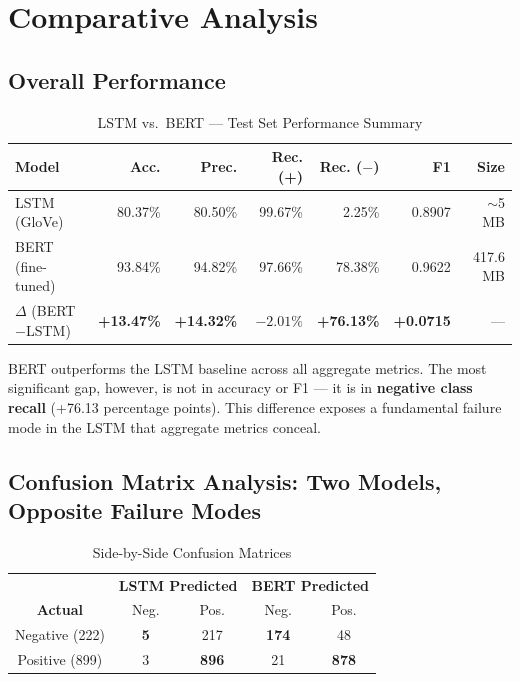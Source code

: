 \documentclass[11pt, a4paper]{article}
\begin{document}
\section{Comparative Analysis}

\subsection{Overall Performance}

\begin{table}[h]
\centering
\caption{LSTM vs.\ BERT --- Test Set Performance Summary}
\begin{tabular}{lrrrrrr}
\toprule
\textbf{Model} & \textbf{Acc.} & \textbf{Prec.} & \textbf{Rec. (+)} & \textbf{Rec. ($-$)} & \textbf{F1} & \textbf{Size} \\
\midrule
LSTM (GloVe)       & 80.37\% & 80.50\% & 99.67\% &  2.25\% & 0.8907 & $\sim$5 MB \\
BERT (fine-tuned)  & 93.84\% & 94.82\% & 97.66\% & 78.38\% & 0.9622 & 417.6 MB \\
\midrule
$\Delta$ (BERT$-$LSTM) & \textbf{+13.47\%} & \textbf{+14.32\%} & $-2.01\%$ & \textbf{+76.13\%} & \textbf{+0.0715} & --- \\
\bottomrule
\end{tabular}
\end{table}

BERT outperforms the LSTM baseline across all aggregate metrics. The most significant gap, however, is not in accuracy or F1 --- it is in \textbf{negative class recall} (+76.13 percentage points). This difference exposes a fundamental failure mode in the LSTM that aggregate metrics conceal.

\subsection{Confusion Matrix Analysis: Two Models, Opposite Failure Modes}

\begin{table}[h]
\centering
\caption{Side-by-Side Confusion Matrices}
\begin{tabular}{c|cc|cc}
\toprule
 & \multicolumn{2}{c|}{\textbf{LSTM Predicted}} & \multicolumn{2}{c}{\textbf{BERT Predicted}} \\
\textbf{Actual} & Neg. & Pos. & Neg. & Pos. \\
\midrule
Negative (222) & \textbf{5}   & 217 & \textbf{174} & 48  \\
Positive (899) & 3            & \textbf{896} & 21  & \textbf{878} \\
\bottomrule
\end{tabular}
\label{tab:cm_compare}
\end{table}
\end{document}

